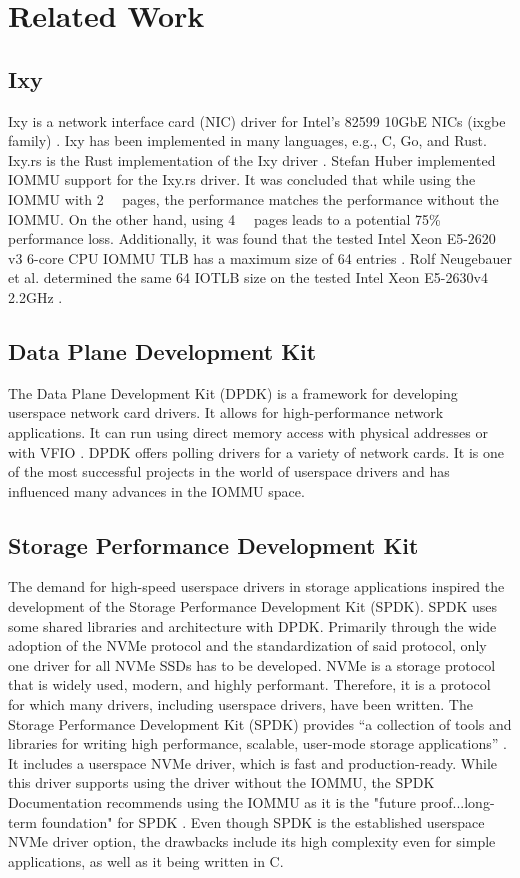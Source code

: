 \chapter{Related Work}

\section{Ixy}
Ixy is a network interface card (NIC) driver for Intel's 82599 10GbE NICs (ixgbe family) \cite{emmerich2019user}.
Ixy has been implemented in many languages, e.g., C, Go, and Rust. Ixy.rs is the Rust implementation of the Ixy driver \cite{baellmann}.
Stefan Huber implemented IOMMU support for the Ixy.rs driver. It was concluded that while using the IOMMU with \qty{2}{\mebi\byte} pages, the performance matches the performance without the IOMMU. On the other hand, using \qty{4}{\kibi\byte} pages leads to a potential 75\% performance loss. Additionally, it was found that the tested Intel Xeon E5-2620 v3 6-core CPU IOMMU TLB has a maximum size of 64 entries \cite{iommuhuber}. Rolf Neugebauer et al. determined the same 64 IOTLB size on the tested Intel Xeon E5-2630v4 2.2GHz \cite{pcieperfnegebauer}.

\section{Data Plane Development Kit}
The Data Plane Development Kit (DPDK) is a framework for developing userspace network card drivers. It allows for high-performance network applications. It can run using direct memory access with physical addresses or with VFIO \cite{aboutdpdk}. DPDK offers polling drivers for a variety of network cards.
It is one of the most successful projects in the world of userspace drivers and has influenced many advances in the IOMMU space.

\section{Storage Performance Development Kit}
The demand for high-speed userspace drivers in storage applications inspired the development of the Storage Performance Development Kit (SPDK). SPDK uses some shared libraries and architecture with DPDK. Primarily through the wide adoption of the NVMe protocol and the standardization of said protocol, only one driver for all NVMe SSDs has to be developed.
NVMe is a storage protocol that is widely used, modern, and highly performant. Therefore, it is a protocol for which many drivers, including userspace drivers, have been written. The Storage Performance Development Kit (SPDK) provides ``a collection of tools and libraries for writing high performance, scalable, user-mode storage applications'' \cite{spdkindex}. It includes a userspace NVMe driver, which is fast and production-ready. While this driver supports using the driver without the IOMMU, the SPDK Documentation recommends using the IOMMU as it is the "future proof...long-term foundation" for SPDK \cite{spdkmemory}. Even though SPDK is the established userspace NVMe driver option, the drawbacks include its high complexity even for simple applications, as well as it being written in C.